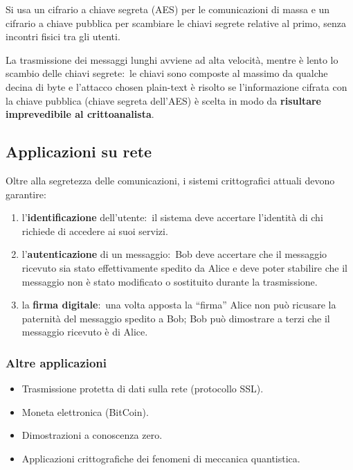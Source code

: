 Si usa un cifrario a chiave segreta (AES) per le comunicazioni di massa e un cifrario a chiave pubblica per scambiare le chiavi segrete relative al primo, senza incontri fisici tra gli utenti.\

La trasmissione dei messaggi lunghi avviene ad alta velocità, mentre è lento lo scambio delle chiavi segrete:\ le chiavi sono composte al massimo da qualche decina di byte e l'attacco chosen plain-text è risolto se l'informazione cifrata con la chiave pubblica (chiave segreta dell'AES) è scelta in modo da \textbf{risultare imprevedibile al crittoanalista}.\

\subsection{Applicazioni su rete}

Oltre alla segretezza delle comunicazioni, i sistemi crittografici attuali devono garantire:
\begin{enumerate}
    \item l'\textbf{identificazione} dell'utente:\ il sistema deve accertare l'identità di chi richiede di accedere ai suoi servizi.\
    \item l'\textbf{autenticazione} di un messaggio:\ Bob deve accertare che il messaggio ricevuto sia stato effettivamente spedito da Alice e deve poter stabilire che il messaggio non è stato modificato o sostituito durante la trasmissione.\
    \item la \textbf{firma digitale}:\ una volta apposta la ``firma'' Alice non può ricusare la paternità del messaggio spedito a Bob; Bob può dimostrare a terzi che il messaggio ricevuto è di Alice.\
\end{enumerate}

\subsubsection{Altre applicazioni}

\begin{itemize}
    \item Trasmissione protetta di dati sulla rete (protocollo SSL).
    \item Moneta elettronica (BitCoin).
    \item Dimostrazioni a conoscenza zero.
    \item Applicazioni crittografiche dei fenomeni di meccanica quantistica.
\end{itemize}
